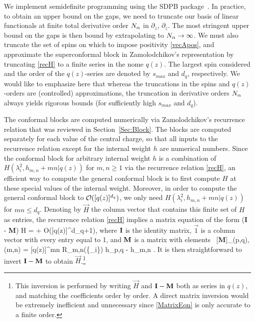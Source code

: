 \documentclass[12pt]{article}
\begin{document}
We implement semidefinite programming using the  SDPB package~\cite{Simmons-Duffin:2015qma}.  In practice, to obtain an upper bound on the gaps, we need to truncate our basis of linear functionals at finite total derivative order $N_{\alpha}$ in $\partial_z$, $\partial_{\bar z}$.  The most stringent upper bound on the gaps is then bound by extrapolating to $N_{\alpha} \to \infty$.  We must also truncate the set of spins on which to impose positivity \eqref{vecApos}, and approximate the superconformal block in Zamolodchikov's representation by truncating \eqref{recH} to a finite series in the nome $q(z)$. The largest spin considered and the order of the $q(z)$-series are denoted by $s_{max}$ and $d_q$, respectively. We would like to emphasize here that whereas the truncations in the spins and $q(z)$-orders are (controlled) approximations, the truncation in derivative orders $N_{\alpha}$ always yields rigorous bounds (for sufficiently high $s_{max}$ and $d_q$).


The conformal blocks are computed numerically via Zamolodchikov's recurrence relation that was reviewed in Section~\ref{Sec:Block}. The blocks are computed separately for each value of the central charge, so that all inputs to the recurrence relation except for the internal weight $h$ are numerical numbers.
Since the conformal block for arbitrary internal weight $h$ is a combination of $H(\lambda^2_i, h_{m,n}+mn | q(z))$ for $m, n \geq 1$ via the recurrence relation \eqref{recH}, an efficient way to compute the general conformal block is to first compute $H$ at these special values of the internal weight. Moreover, in order to compute the general conformal block to ${\cal O}([q(z)]^{d_q})$, we only need $H(\lambda^2_i, h_{m,n}+mn | q(z))$ for $mn \leq d_q$. Denoting by $\vec H$ the column vector that contains this finite set of $H$ as entries, the recurrence relation \eqref{recH} implies a matrix equation of the form
\ie
\label{MatrixEqn}
({\bf I} - {\bf M}) \vec H =  + {\cal O}([q(z)]^{d_q+1}),
\fe
where ${\bf I}$ is the identity matrix, $\vec 1$ is a column vector with every entry equal to 1, and ${\bf M}$ is a matrix with elements
\ie
~[{\bf M}]_{(p,q), (m,n)} = {[q(z)]^{mn} R_{m,n}(\{\lambda_i\}) \over h_{p,q} - h_{m,n} }.
\fe
It is then straightforward to invert ${\bf I} - {\bf M}$ to obtain $\vec H$.\footnote{This inversion is performed by writing $\vec H$ and ${\bf I} - {\bf M}$ both as series in $q(z)$, and matching the coefficients order by order. A direct matrix inversion would be extremely inefficient and unnecessary since \eqref{MatrixEqn} is only accurate to a finite order.
}
\end{document}
